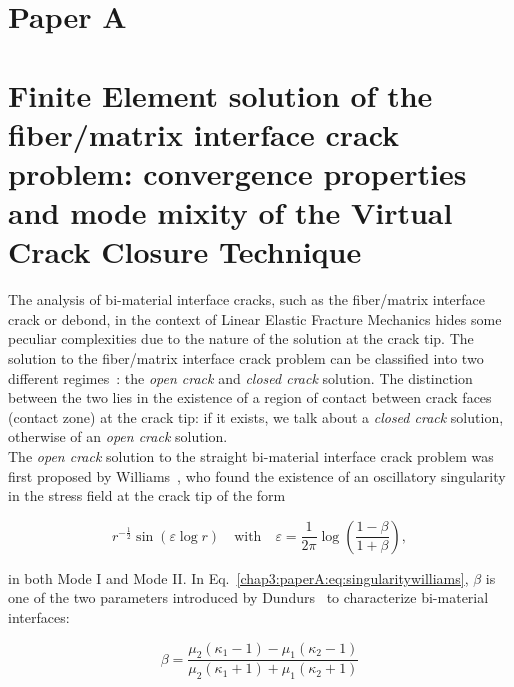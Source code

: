 \section{Paper A}\label{chap3:paperA}
\section*{Finite Element solution of the fiber/matrix interface crack problem: convergence properties and mode mixity of the Virtual Crack Closure Technique}

The analysis of bi-material interface cracks, such as the fiber/matrix interface crack or debond, in the context of Linear Elastic Fracture Mechanics hides some peculiar complexities due to the nature of the solution at the crack tip. The solution to the fiber/matrix interface crack problem can be classified into two different regimes~\cite{Paris1996,Varna1997a}: the \emph{open crack} and \emph{closed crack} solution. The distinction between the two lies in the existence of a region of contact between crack faces (contact zone) at the crack tip: if it exists, we talk about a \emph{closed crack} solution, otherwise of an \emph{open crack} solution.\\
The \emph{open crack} solution to the straight bi-material interface crack problem was first proposed by Williams~\cite{Williams1959}, who found the existence of an oscillatory singularity in the stress field at the crack tip of the form

\begin{equation}\label{chap3:paperA:eq:singularitywilliams}
r^{-\frac{1}{2}}\sin\left(\varepsilon\log r\right)\quad\text{with}\quad\varepsilon=\frac{1}{2\pi}\log\left(\frac{1-\beta}{1+\beta}\right),
\end{equation}

in both Mode I and Mode II. In Eq.~\ref{chap3:paperA:eq:singularitywilliams}, $\beta$ is one of the two parameters introduced by Dundurs~\cite{Dundurs1969} to characterize bi-material interfaces:

\begin{equation}\label{chap3:paperA:eq:dundursbeta}
\beta=\frac{\mu_{2}\left(\kappa_{1}-1\right)-\mu_{1}\left(\kappa_{2}-1\right)}{\mu_{2}\left(\kappa_{1}+1\right)+\mu_{1}\left(\kappa_{2}+1\right)}
\end{equation}

